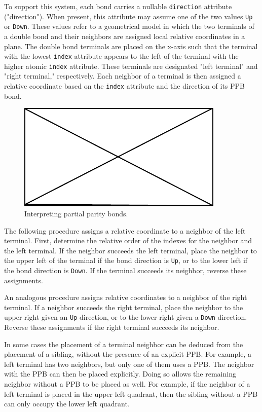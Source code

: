 \documentclass{article}
\def\ttt{\texttt}
\begin{document}
To support this system, each bond carries a nullable \ttt{direction} attribute ("direction"). When present, this attribute may assume one of the two values \ttt{Up} or \ttt{Down}. These values refer to a geometrical model in which the two terminals of a double bond and their neighbors are assigned local relative coordinates in a plane. The double bond terminals are placed on the x-axis such that the terminal with the lowest \ttt{index} attribute appears to the left of the terminal with the higher atomic \ttt{index} attribute. These terminals are designated "left terminal" and "right terminal," respectively. Each neighbor of a terminal is then assigned a relative coordinate based on the \ttt{index} attribute and the direction of its PPB bond.

\begin{figure}
    \centering
    \includegraphics{filler}
    \caption{Interpreting partial parity bonds.}
    \label{fig:interpret-ppb}
\end{figure}

The following procedure assigns a relative coordinate to a neighbor of the left terminal. First, determine the relative order of the indexes for the neighbor and the left terminal. If the neighbor succeeds the left terminal, place the neighbor to the upper left of the terminal if the bond direction is \ttt{Up}, or to the lower left if the bond direction is \ttt{Down}. If the terminal succeeds its neighbor, reverse these assignments.

An analogous procedure assigns relative coordinates to a neighbor of the right terminal. If a neighbor succeeds the right terminal, place the neighbor to the upper right given an \ttt{Up} direction, or to the lower right given a \ttt{Down} direction. Reverse these assignments if the right terminal succeeds its neighbor.

In some cases the placement of a terminal neighbor can be deduced from the placement of a sibling, without the presence of an explicit PPB. For example, a left terminal has two neighbors, but only one of them uses a PPB. The neighbor with the PPB can then be placed explicitly. Doing so allows the remaining neighbor without a PPB to be placed as well. For example, if the neighbor of a left terminal is placed in the upper left quadrant, then the sibling without a PPB can only occupy the lower left quadrant.
\end{document}
